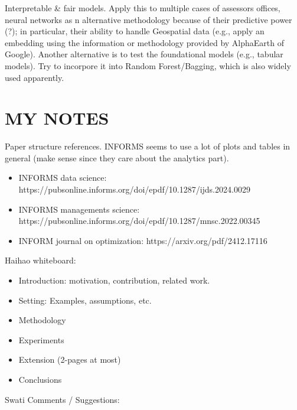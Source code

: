 \documentclass[12pt, draft]{article}
\theoremstyle{plain}
\theoremstyle{definition}
\newcommand{\1}{\mathbf{1}}
\begin{document}
Interpretable \& fair models. Apply this to multiple cases of assessors offices, neural networks as n alternative methodology because of their predictive power (?); in particular, their ability to handle Geospatial data (e.g., apply an embedding using the information or methodology provided by AlphaEarth of Google). Another alternative is to test the foundational models (e.g., tabular models). Try to incorpore it into Random Forest/Bagging, which is also widely used apparently.

\section{MY NOTES}

Paper structure references. INFORMS seems to use a lot of plots and tables in general (make sense since they care about the analytics part).
\begin{itemize}
    \item INFORMS data science: https://pubsonline.informs.org/doi/epdf/10.1287/ijds.2024.0029
    \item INFORMS managements science: https://pubsonline.informs.org/doi/epdf/10.1287/mnsc.2022.00345
    \item INFORM journal on optimization: https://arxiv.org/pdf/2412.17116
\end{itemize}



\noindent Haihao whiteboard:
\begin{itemize}
    \item Introduction: motivation, contribution, related work.
    \item Setting: Examples, assumptions, etc.
    \item Methodology
    \item Experiments 
    \item Extension (2-pages at most)
    \item Conclusions
\end{itemize}

\noindent Swati Comments / Suggestions:
\end{document}
